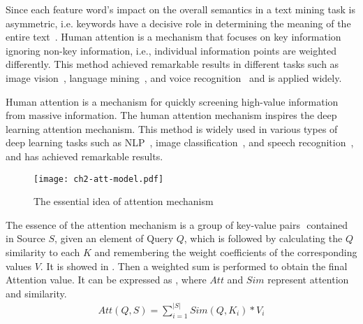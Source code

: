 


Since each feature word's impact on the overall semantics in a text mining task is asymmetric, i.e. keywords have a decisive role in determining the meaning of the entire text~\cite{chaudhari2020attentive}. Human attention is a mechanism that focuses on key information ignoring non-key information, i.e., individual information points are weighted differently. This method achieved remarkable results in different tasks such as image vision~\cite{fu2017look,sun2018multi}, language mining~\cite{hu2019introductory}, and voice recognition~\cite{chorowski2015attention} and is applied widely.


Human attention is a mechanism for quickly screening high-value information from massive information. The human attention mechanism inspires the deep learning attention mechanism. This method is widely used in various types of deep learning tasks such as NLP~\cite{hu2019introductory}, image classification~\cite{fu2017look,sun2018multi}, and speech recognition~\cite{chorowski2015attention}, and has achieved remarkable results.

\begin{figure}[htb]
    \centering
    \texttt{[image: ch2-att-model.pdf]}
    \caption{The essential idea of attention mechanism}\label{fig:ch2-model-attmodel}
\end{figure}


The essence of the attention mechanism is a group of key-value pairs \(<K, V>\) contained in Source \(S\), given an element of Query \(Q\), which is followed by calculating the \(Q\) similarity to each \(K\) and remembering the weight coefficients of the corresponding values \(V\). It is showed in \figname{\ref{fig:ch2-model-attmodel}}. Then a weighted sum is performed to obtain the final Attention value. It can be expressed as \eqname{\ref{fml:ch2-attention}}, where \(Att\) and \(Sim\) represent attention and similarity.
\begin{align}\label{fml:ch2-attention}
    Att(Q,S) = \sum_{i=1}^{|S|}Sim(Q,K_i)*V_i
\end{align}

